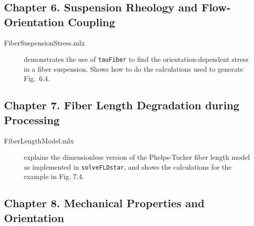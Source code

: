 \documentclass[11pt]{article}
\begin{document}
\subsection*{Chapter 6. Suspension Rheology and Flow-Orientation Coupling}

\begin{description}

    \item[FiberSuspensionStress.mlx]{demonstrates the use of \texttt{tauFiber} to find the orientation-dependent stress in a fiber suspension.  Shows how to do the calculations used to generate Fig.~6.4.}
    
\end{description}

\subsection*{Chapter 7. Fiber Length Degradation during Processing}

\begin{description}

    \item[FiberLengthModel.mlx]{explains the dimensionless version of the Phelps-Tucker fiber length model as implemented in \texttt{solveFLDstar}, and shows the calculations for the example in Fig. 7.4.}

\end{description}

\subsection*{Chapter 8. Mechanical Properties and Orientation}
\end{document}
